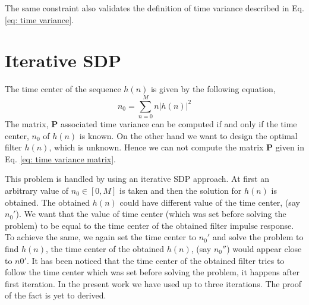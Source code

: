 The same constraint also validates the definition of time variance described in Eq. \ref{eq: time variance}.

\section{Iterative SDP}
\label{sec: Iterative SDP}
The time center of the sequence $h(n)$ is given by the following equation,
\begin{equation}
n_0 = \sum_{n=0}^{M} n |h(n)|^2
\end{equation} 
The matrix, $\mathbf{P}$ associated time variance can be computed if and only if the time center, $n_0$ of $h(n)$ is known. On the other hand we want to design the optimal filter $h(n)$, which is unknown. Hence we can not compute the matrix $\mathbf{P}$ given in Eq. \ref{eq: time variance matrix}. 

This problem is handled by using an iterative SDP approach. At first an arbitrary value of $ n_0 \in [0,M]$ is taken and then the solution for $h(n)$ is obtained. The  obtained $h(n)$ could have different value of the time center, (say $n_0'$). We want that the value of time center (which was set before solving the problem) to be equal to the time center of the obtained filter impulse response. To achieve the same, we again set the time center to $n_0'$ and solve the problem to find $h(n)$, the time center of the obtained $h(n)$, (say $n_0''$) would appear close to $n0'$. It has been noticed that the time center of the obtained filter tries to follow the time center which was set before solving the problem, it happens after first iteration. In the present work we have used up to three iterations. The proof of the fact is yet to derived.

